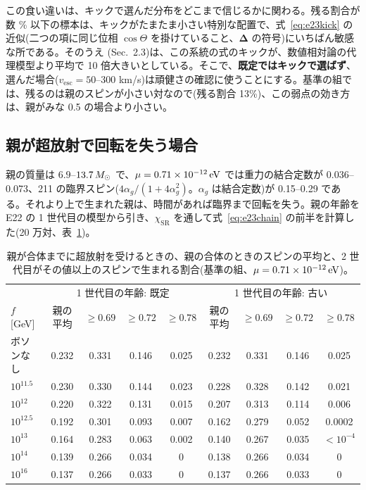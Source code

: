 この食い違いは、キックで選んだ分布をどこまで信じるかに関わる。残る割合が数 \% 以下の標本は、キックがたまたま小さい特別な配置で、式~\eqref{eq:e23kick} の近似(二つの項に同じ位相 $\cos\Theta$ を掛けていること、$\boldsymbol\Delta$ の符号)にいちばん敏感な所である。そのうえ (Sec.~2.3)は、この系統の式のキックが、数値相対論の代理模型より平均で 10 倍大きいとしている。そこで、\textbf{既定ではキックで選ばず}、選んだ場合($v_\mathrm{esc}=50$--300 km/s)は頑健さの確認に使うことにする。基準の組では、残るのは親のスピンが小さい対なので(残る割合 13\%)、この弱点の効き方は、親がみな 0.5 の場合より小さい。

\subsection{親が超放射で回転を失う場合}

親の質量は $6.9$--$13.7\,M_\odot$ で、$\mu=0.71\times10^{-12}\,\mathrm{eV}$ では重力の結合定数が 0.036--0.073、211 の臨界スピン($4\alpha_g/(1+4\alpha_g^2)$。$\alpha_g$ は結合定数)が 0.15--0.29 である。それより上で生まれた親は、時間があれば臨界まで回転を失う。親の年齢を E22 の 1 世代目の模型から引き、$\chi_\mathrm{SR}$ を通して式~\eqref{eq:e23chain} の前半を計算した(20 万対、表~\ref{tab:e23boson})。

\begin{table}[H]
\centering\small
\begin{tabular}{lcccc@{\qquad}cccc}
\toprule
 & \multicolumn{4}{c}{1 世代目の年齢: 既定} & \multicolumn{4}{c}{1 世代目の年齢: 古い}\\
$f$ [GeV] & 親の平均 & $\ge0.69$ & $\ge0.72$ & $\ge0.78$ & 親の平均 & $\ge0.69$ & $\ge0.72$ & $\ge0.78$\\
\midrule
ボソンなし & 0.232 & 0.331 & 0.146 & 0.025 & 0.232 & 0.331 & 0.146 & 0.025\\
$10^{11.5}$ & 0.230 & 0.330 & 0.144 & 0.023 & 0.228 & 0.328 & 0.142 & 0.021\\
$10^{12}$ & 0.220 & 0.322 & 0.131 & 0.015 & 0.207 & 0.313 & 0.114 & 0.006\\
$10^{12.5}$ & 0.192 & 0.301 & 0.093 & 0.007 & 0.162 & 0.279 & 0.052 & 0.0002\\
$10^{13}$ & 0.164 & 0.283 & 0.063 & 0.002 & 0.140 & 0.267 & 0.035 & $<10^{-4}$\\
$10^{14}$ & 0.139 & 0.266 & 0.034 & 0 & 0.138 & 0.266 & 0.034 & 0\\
$10^{16}$ & 0.137 & 0.266 & 0.033 & 0 & 0.137 & 0.266 & 0.033 & 0\\
\bottomrule
\end{tabular}
\caption{親が合体までに超放射を受けるときの、親の合体のときのスピンの平均と、2 世代目がその値以上のスピンで生まれる割合(基準の組、$\mu=0.71\times10^{-12}\,\mathrm{eV}$)。}
\label{tab:e23boson}
\end{table}

